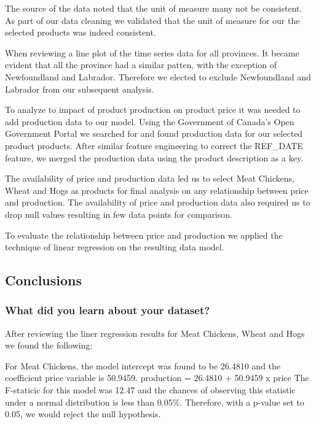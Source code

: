 The source of the data noted that the unit of measure many not be consistent. As part of our data cleaning we validated that the unit of measure for our the selected products was indeed consistent. 

When reviewing a line plot of the time series data for all provinces. It became evident that all the province had a similar patten, with the exception of Newfoundland and Labrador. Therefore we elected to exclude Newfoundland and Labrador from our subsequent analysis.

To analyze to impact of product production on product price it was needed to add production data to our model. Using the Government of Canada's Open Government Portal we searched for and found production data for our selected product products. After similar feature engineering to correct the REF\_DATE feature, we merged the production data using the product description as a key.

The availability of price and production data led us to select Meat Chickens, Wheat and Hogs as products for final analysis on any relationship between price and production. The availability of price and production data also required us to drop null values resulting in few data points for comparison.

To evaluate the relationship between price and production we applied the technique of linear regression on the resulting data model.

\subsection{Conclusions}

\subsubsection{What did you learn about your dataset?}

After reviewing the liner regression results for Meat Chickens, Wheat and Hogs we found the following:

For Meat Chickens, the model intercept was found to be 26.4810 and the coefficient price variable is 50.9459. 
\newline
production = 26.4810 + 50.9459 x price
\newline
The F-staticic for this model was 12.47 and the chances of observing this statistic under a normal distribution is less than 0.05\%. Therefore, with a p-value set to 0.05, we would reject the null hypothesis. 

